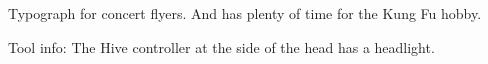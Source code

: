 \begin{npcBox}[title=Norm: Sam]
    \begin{stressSection}
    \end{stressSection}
    \begin{tabularx}{\textwidth}{ XX }
    \end{tabularx}

    \begin{consequences}
    \item {}
    \item {}
    \item {}
    \end{consequences}

    \begin{npcDescription}

    Typograph for concert flyers. And has plenty of time for the Kung Fu hobby.

    Tool info: The Hive controller at the side of the head has a headlight.

    \end{npcDescription}

\end{npcBox}

